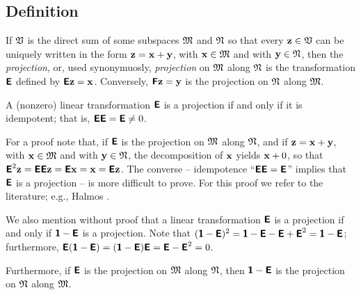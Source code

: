 \subsection{Definition}
If ${\frak V}$ is the direct sum of some subspaces
${\frak M}$
and
${\frak N}$
so that every ${\bf z} \in {\frak V}$ can be uniquely written in the form
$
{\bf z}
=
{\bf x}
+
{\bf y}
$, with
${\bf x} \in {\frak M}$
and with
${\bf y} \in {\frak N}$,
then
the {\em projection}, or, used synonymuosly,
{\em projection}
on ${\frak M}$
along ${\frak N}$ is the transformation $\textsf{\textbf{E}}$
defined by $\textsf{\textbf{E}}{\bf z}={\bf x}$.
Conversely,
 $\textsf{\textbf{F}}{\bf z}={\bf y}$  is the projection
on ${\frak N}$
along ${\frak M}$.

A (nonzero) linear transformation
$\textsf{\textbf{E}}$ is a projection if and only if
it is idempotent; that is,
$\textsf{\textbf{E}}\textsf{\textbf{E}}=\textsf{\textbf{E}}\neq 0$.

{\color{OliveGreen}
\bproof
For a proof note that, if $\textsf{\textbf{E}}$  is the projection
on ${\frak M}$
along ${\frak N}$,
and if
$
{\bf z}
=
{\bf x}
+
{\bf y}
$, with
${\bf x} \in {\frak M}$
and with
${\bf y} \in {\frak N}$,
the decomposition of ${\bf x}$ yields
${\bf x}+0$, so that
$\textsf{\textbf{E}}^2{\bf z}=\textsf{\textbf{E}}\textsf{\textbf{E}}{\bf z}=\textsf{\textbf{E}}{\bf x}
={\bf x}=\textsf{\textbf{E}}{\bf z}$.
The converse --
idempotence
``$\textsf{\textbf{E}}\textsf{\textbf{E}}=\textsf{\textbf{E}}$''
implies that $\textsf{\textbf{E}}$ is a projection -- is more difficult to prove.
For this proof we refer to the literature; e.g., Halmos \cite{halmos-vs}.
\eproof
}

We also mention without proof that a linear transformation
$\textsf{\textbf{E}}$ is a projection if and only if
$\textsf{\textbf{1}}-\textsf{\textbf{E}}$ is a projection.
Note that $(\textsf{\textbf{1}}-\textsf{\textbf{E}})^2
=\textsf{\textbf{1}}-\textsf{\textbf{E}}-\textsf{\textbf{E}}+ \textsf{\textbf{E}}^2
=\textsf{\textbf{1}}-\textsf{\textbf{E}}$;
furthermore,
$
\textsf{\textbf{E}}(\textsf{\textbf{1}}-\textsf{\textbf{E}})=
(\textsf{\textbf{1}}-\textsf{\textbf{E}})\textsf{\textbf{E}}=
\textsf{\textbf{E}}- \textsf{\textbf{E}}^2=0
$.


Furthermore, if $\textsf{\textbf{E}}$  is the projection
on ${\frak M}$
along ${\frak N}$,
then
 $\textsf{\textbf{1}}-\textsf{\textbf{E}}$ is the projection
on ${\frak N}$
along ${\frak M}$.




